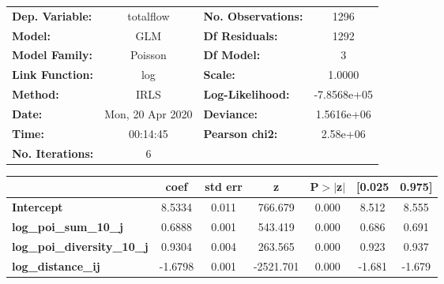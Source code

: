 \begin{center}
\begin{tabular}{lclc}
\toprule
\textbf{Dep. Variable:}             &    totalflow     & \textbf{  No. Observations:  } &      1296    \\
\textbf{Model:}                     &       GLM        & \textbf{  Df Residuals:      } &      1292    \\
\textbf{Model Family:}              &     Poisson      & \textbf{  Df Model:          } &         3    \\
\textbf{Link Function:}             &       log        & \textbf{  Scale:             } &     1.0000   \\
\textbf{Method:}                    &       IRLS       & \textbf{  Log-Likelihood:    } & -7.8568e+05  \\
\textbf{Date:}                      & Mon, 20 Apr 2020 & \textbf{  Deviance:          } &  1.5616e+06  \\
\textbf{Time:}                      &     00:14:45     & \textbf{  Pearson chi2:      } &   2.58e+06   \\
\textbf{No. Iterations:}            &        6         & \textbf{                     } &              \\
\bottomrule
\end{tabular}
\begin{tabular}{lcccccc}
                                    & \textbf{coef} & \textbf{std err} & \textbf{z} & \textbf{P$> |$z$|$} & \textbf{[0.025} & \textbf{0.975]}  \\
\midrule
\textbf{Intercept}                  &       8.5334  &        0.011     &   766.679  &         0.000        &        8.512    &        8.555     \\
\textbf{log\_poi\_sum\_10\_j}       &       0.6888  &        0.001     &   543.419  &         0.000        &        0.686    &        0.691     \\
\textbf{log\_poi\_diversity\_10\_j} &       0.9304  &        0.004     &   263.565  &         0.000        &        0.923    &        0.937     \\
\textbf{log\_distance\_ij}          &      -1.6798  &        0.001     & -2521.701  &         0.000        &       -1.681    &       -1.679     \\
\bottomrule
\end{tabular}
\end{center}
